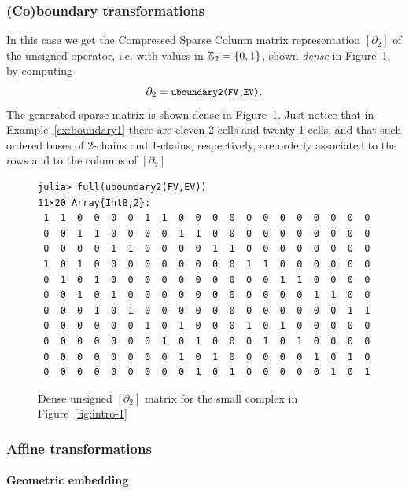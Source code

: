 \subsubsection{(Co)boundary transformations}


\begin{example}

In this case we get the Compressed Sparse Column matrix representation $[\partial_2]$ of the unsigned operator, i.e. with values in $\mathbb{Z}_2=\{0,1\}$, shown \emph{dense} in Figure~\ref{fig:intro-3}, by computing
\[
\partial_2 = \small\texttt{uboundary2(FV,EV)}.
\]
The generated sparse matrix is shown dense in Figure~\ref{fig:intro-3}.
Just notice that in Example~\ref{ex:boundary1} there are eleven 2-cells and twenty 1-cells, and that such ordered bases of 2-chains and 1-chains, respectively, are orderly associated to the rows and to the columns of $[\partial_2]$

\begin{figure}[htbp] %
\small\begin{verbatim}
julia> full(uboundary2(FV,EV))
11×20 Array{Int8,2}:
 1  1  0  0  0  0  1  1  0  0  0  0  0  0  0  0  0  0  0  0
 0  0  1  1  0  0  0  0  1  1  0  0  0  0  0  0  0  0  0  0
 0  0  0  0  1  1  0  0  0  0  1  1  0  0  0  0  0  0  0  0
 1  0  1  0  0  0  0  0  0  0  0  0  1  1  0  0  0  0  0  0
 0  1  0  1  0  0  0  0  0  0  0  0  0  0  1  1  0  0  0  0
 0  0  1  0  1  0  0  0  0  0  0  0  0  0  0  0  1  1  0  0
 0  0  0  1  0  1  0  0  0  0  0  0  0  0  0  0  0  0  1  1
 0  0  0  0  0  0  1  0  1  0  0  0  1  0  1  0  0  0  0  0
 0  0  0  0  0  0  0  1  0  1  0  0  0  1  0  1  0  0  0  0
 0  0  0  0  0  0  0  0  1  0  1  0  0  0  0  0  1  0  1  0
 0  0  0  0  0  0  0  0  0  1  0  1  0  0  0  0  0  1  0  1
\end{verbatim}
   \caption{Dense unsigned $[\partial_2]$ matrix for the small complex in Figure~\ref{fig:intro-1}}
   \label{fig:intro-3}
\end{figure}

\end{example}


\subsubsection{Affine transformations}


\paragraph{Geometric embedding}

